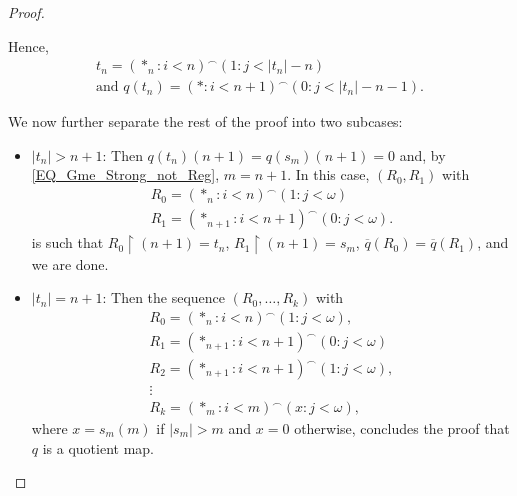 \documentclass[10pt,a4paper]{amsart}
\DeclareMathOperator{\restrict}{\upharpoonright}
\newcommand{\seq}[1]{{\left( {#1} \right)}}
\begin{document}
\begin{proof}
\begin{itemize}
		Hence, 
		\begin{gather*}
			t_n = \seq{\ast_n: i<n}^\smallfrown \seq{1:j<|t_n|-n}\\
			\text{and } q(t_n) = \seq{\ast: i<n+1}^\smallfrown \seq{0:j<|t_n|-n-1}.
		\end{gather*}
		
		We now further separate the rest of the proof into two subcases:
		
		\begin{itemize}
			\item $|t_n|>n+1$: Then $q(t_n)(n+1) =q(s_m)(n+1)= 0$ and, by \eqref{EQ_Gme_Strong_not_Reg}, $m=n+1$. In this case, $\seq{R_0,R_1}$ with
			\begin{gather*}
				R_0=\seq{\ast_n:i<n}^\smallfrown \seq{1:j<\omega}\\
				R_1 = \seq{\ast_{n+1}:i<n+1}^\smallfrown\seq{0:j<\omega}.
			\end{gather*} 
			is such that $R_0\restrict (n+1) = t_n$, $R_1\restrict (n+1) = s_m$,  $\overline{q}(R_0)=\overline{q}(R_1)$, and we are done.
			\item $|t_n|=n+1$: Then the sequence $\seq{R_0, \dotsc, R_k}$ with 
			\begin{gather*}
				R_0 = \seq{\ast_n: i<n}^\smallfrown\seq{1:j<\omega},\\
				R_1 = \seq{\ast_{n+1}: i<n+1}^\smallfrown\seq{0:j<\omega}\\
				R_2 = \seq{\ast_{n+1}: i<n+1}^\smallfrown\seq{1:j<\omega},\\
				\vdots\\
				R_k = \seq{\ast_{m}: i<m}^\smallfrown\seq{x:j<\omega},
			\end{gather*}
			where $x=s_m(m)$ if $|s_m|>m$ and $x=0$ otherwise, concludes the proof that $q$ is a quotient map.
		\end{itemize} 
	\end{itemize}
\end{proof}
\end{document}
